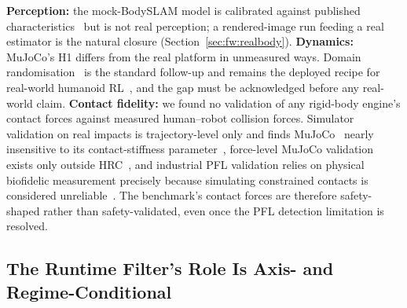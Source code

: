 \documentclass[11pt,a4paper]{report}
\newcommand{\pfl}{PFL}
\newcommand{\bodyslampp}{BodySLAM\nolinebreak[4]\hspace{-.05em}\raisebox{.2ex}{\scriptsize ++}}
\begin{document}
\textbf{Perception:} the mock-\bodyslampp{} model is calibrated
against published characteristics~\cite{henning2023bodyslampp} but
is not real perception; a rendered-image run feeding a real
estimator is the natural closure
(Section~\ref{sec:fw:realbody}). \textbf{Dynamics:} MuJoCo's H1
differs from the real platform in unmeasured ways. Domain
randomisation~\cite{tobin2017domainrand,muratore2022randomized}
is the standard follow-up and remains the deployed recipe for
real-world humanoid RL~\cite{radosavovic2024humanoid}, and the gap
must be acknowledged before any real-world claim. \textbf{Contact
fidelity:} we found no validation of any rigid-body engine's contact
forces against measured human--robot collision forces.
Simulator validation on real impacts is trajectory-level only and
finds MuJoCo~\cite{todorov2012mujoco} nearly insensitive to its
contact-stiffness parameter~\cite{acosta2022simvalidation},
force-level MuJoCo validation exists only outside
HRC~\cite{joseph2026mujoco}, and industrial \pfl{} validation relies
on physical biofidelic measurement precisely because simulating
constrained contacts is considered
unreliable~\cite{schlotzhauer2022pfl,svarny2020collision}. The
benchmark's contact forces are therefore safety-shaped rather than
safety-validated, even once the \pfl{} detection limitation is
resolved.

\subsection{The Runtime Filter's Role Is Axis- and Regime-Conditional}
\label{sec:disc:filter-role}
\end{document}
